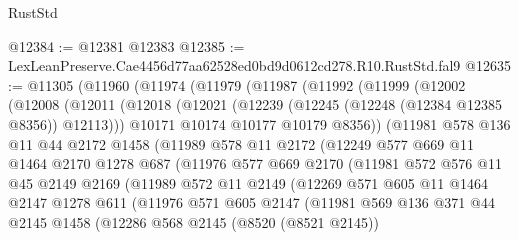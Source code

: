\begin{lexlean}{RustStd}
\begin{coremodule}
@12384 := @12381 @12383
@12385 := LexLeanPreserve.Cae4456d77aa62528ed0bd9d0612cd278.R10.RustStd.fal9
@12635 := @11305
    (@11960
      (@11974
        (@11979
          (@11987
            (@11992
              (@11999
                (@12002
                  (@12008
                    (@12011
                      (@12018
                        (@12021 (@12239 (@12245 (@12248 (@12384 @12385 @8356)) @12113)))
                        @10171
                        @10174
                        @10177
                        @10179
                        @8356))
                    (@11981
                      @578
                      @136
                      @11
                      @44
                      @2172
                      @1458
                      (@11989
                        @578
                        @11
                        @2172
                        (@12249
                          @577
                          @669
                          @11
                          @1464
                          @2170
                          @1278
                          @687
                          (@11976
                            @577
                            @669
                            @2170
                            (@11981
                              @572
                              @576
                              @11
                              @45
                              @2149
                              @2169
                              (@11989
                                @572
                                @11
                                @2149
                                (@12269
                                  @571
                                  @605
                                  @11
                                  @1464
                                  @2147
                                  @1278
                                  @611
                                  (@11976
                                    @571
                                    @605
                                    @2147
                                    (@11981
                                      @569
                                      @136
                                      @371
                                      @44
                                      @2145
                                      @1458
                                      (@12286
                                        @568
                                        @2145
                                        (@8520 (@8521 @2145))

\end{coremodule}
\end{lexlean}
